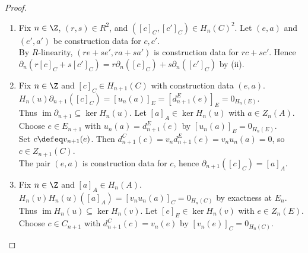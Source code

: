 \begin{theorem}
\begin{proof}
\begin{enumerate}[label=(\roman*)]
Then $c'-c\in B_n(C)$ by Proposition \ref{prop:quotient-module-well-defined}(i). Choose $t\in C_{n+1}$ with $c'-c=d^C_{n+1}(t)$ by Definition \ref{def:cycles-boundaries-homology}(ii).\\
The map $v_{n+1}$ is surjective by Corollary \ref{cor:short-exact-complexes-degreewise-criterion} and Definition \ref{def:module-homomorphism}(iv). Choose $s\in E_{n+1}$ with $v_{n+1}(s)=t$.\\
Set $e'\defeq e+d^E_{n+1}(s)$. Then $v_n(e')=c+d^C_{n+1}(t)=c'$ by the chain-map identity for $v_\bullet$.\\
$d^E_n(e')=d^E_n(e)$ by Definition \ref{def:chain-complex}, so $(e',a)$ is construction data for $c'$. Now $e''-e'\in\ker v_n=\operatorname{im}u_n$ by Corollary \ref{cor:short-exact-complexes-degreewise-criterion}.\\
Choose $x\in A_n$ with $u_n(x)=e''-e'$. $u_{n-1}(a''-a-d^A_nx)=0$ by construction data, differential commutation, $u_n(x)=e''-e'$.\\
The map $u_{n-1}$ is injective by Corollary \ref{cor:short-exact-complexes-degreewise-criterion} and Definition \ref{def:module-homomorphism}(iv). Thus $a''-a=d^A_nx\in B_{n-1}(A)$ and $[a'']_A=[a]_A$.
\item Fix $n\in\Z$, $(r,s)\in R^2$, and $([c]_C,[c']_C)\in H_n(C)^2$. Let $(e,a)$ and $(e',a')$ be construction data for $c,c'$.\\
By $R$-linearity, $(re+se',ra+sa')$ is construction data for $rc+sc'$. Hence $\partial_n(r[c]_C+s[c']_C)=r\partial_n([c]_C)+s\partial_n([c']_C)$ by (ii).
\item Fix $n\in\Z$ and $[c]_C\in H_{n+1}(C)$ with construction data $(e,a)$. $H_n(u)\partial_{n+1}([c]_C)=[u_n(a)]_E=[d^E_{n+1}(e)]_E=0_{H_n(E)}$.\\
Thus $\operatorname{im}\partial_{n+1}\subseteq\ker H_n(u)$. Let $[a]_A\in\ker H_n(u)$ with $a\in Z_n(A)$. Choose $e\in E_{n+1}$ with $u_n(a)=d^E_{n+1}(e)$ by $[u_n(a)]_E=0_{H_n(E)}$.\\
Set $c\defeq v_{n+1}(e)$. Then $d^C_{n+1}(c)=v_nd^E_{n+1}(e)=v_nu_n(a)=0$, so $c\in Z_{n+1}(C)$.\\
The pair $(e,a)$ is construction data for $c$, hence $\partial_{n+1}([c]_C)=[a]_A$.
\item Fix $n\in\Z$ and $[a]_A\in H_n(A)$. $H_n(v)H_n(u)([a]_A)=[v_nu_n(a)]_C=0_{H_n(C)}$ by exactness at $E_n$.\\
Thus $\operatorname{im}H_n(u)\subseteq\ker H_n(v)$. Let $[e]_E\in\ker H_n(v)$ with $e\in Z_n(E)$. Choose $c\in C_{n+1}$ with $d^C_{n+1}(c)=v_n(e)$ by $[v_n(e)]_C=0_{H_n(C)}$.\\

\end{enumerate}
\end{proof}
\end{theorem}
